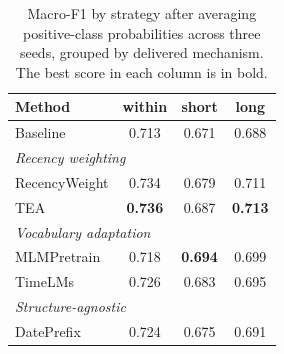 \begin{table}[t]
\caption{Macro-F1 by strategy after averaging positive-class probabilities across three seeds, grouped by delivered mechanism. The best score in each column is in bold.}
\label{tab:results}
\centering
\begin{tabular}{lccc}
\toprule
Method & within & short & long \\
\midrule
Baseline                 & 0.713 & 0.671 & 0.688 \\
\midrule
\multicolumn{4}{l}{\textit{Recency weighting}} \\
RecencyWeight            & 0.734 & 0.679 & 0.711 \\
TEA                      & \textbf{0.736} & 0.687 & \textbf{0.713} \\
\midrule
\multicolumn{4}{l}{\textit{Vocabulary adaptation}} \\
MLMPretrain              & 0.718 & \textbf{0.694} & 0.699 \\
TimeLMs                  & 0.726 & 0.683 & 0.695 \\
\midrule
\multicolumn{4}{l}{\textit{Structure-agnostic}} \\
DatePrefix               & 0.724 & 0.675 & 0.691 \\
\bottomrule
\end{tabular}
\end{table}
